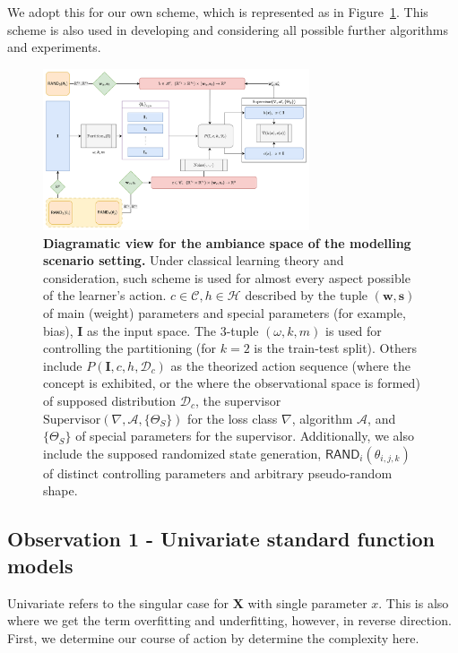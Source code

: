\documentclass{article}
\begin{document}
We adopt this for our own scheme, which is represented as in Figure~\ref{fig:vapnik_scheme}. This scheme is also used in developing and considering all possible further algorithms and experiments. 
\begin{figure}[htb]
  \centering
  \includegraphics[width=0.7\textwidth]{Diagramatic_Modelling_View.png}
  \caption{\textbf{Diagramatic view for the ambiance space of the modelling scenario setting.} Under classical learning theory and consideration, such scheme is used for almost every aspect possible of the learner's action. $c\in\mathcal{C}, h\in \mathcal{H}$ described by the tuple $(\mathbf{w},\mathbf{s})$ of main (weight) parameters and special parameters (for example, bias), $\mathbf{I}$ as the input space. The 3-tuple $(\omega, k,m)$ is used for controlling the partitioning (for $k=2$ is the train-test split). Others include $P(\mathbf{I},c,h,\mathcal{D}_{c})$ as the theorized action sequence (where the concept is exhibited, or the where the observational space is formed) of supposed distribution $\mathcal{D}_{c}$, the supervisor $\text{Supervisor}(\nabla, \mathcal{A}, \{\Theta_{S}\})$ for the loss class $\nabla$, algorithm $\mathcal{A}$, and $\{\Theta_{S}\}$ of special parameters for the supervisor. Additionally, we also include the supposed randomized state generation, $\mathsf{RAND}_{i}(\theta_{i,j,k})$ of distinct controlling parameters and arbitrary pseudo-random shape.}
  \label{fig:vapnik_scheme}
\end{figure}


\subsection{Observation 1 - Univariate standard function models}

Univariate refers to the singular case for $\mathbf{X}$ with single parameter $x$. This is also where we get the term overfitting and underfitting, however, in reverse direction. First, we determine our course of action by determine the complexity here. 
\end{document}
